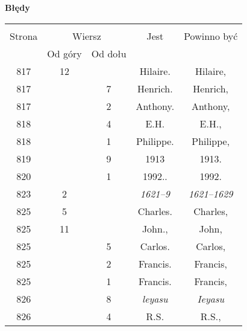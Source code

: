\documentclass[a4paper,11pt]{article}
\newcommand{\tb}{\textbf}
\newcommand{\Center}[1]{\begin{center} #1 \end{center}}
\newcommand{\CenterTB}[1]{\Center{\tb{#1}}}
\begin{document}
\CenterTB{Błędy}
\begin{center}
  \begin{tabular}{|c|c|c|c|c|}
    \hline
    & \multicolumn{2}{c|}{} & & \\
    Strona & \multicolumn{2}{c|}{Wiersz}& Jest & Powinno być \\ \cline{2-3}
    & Od góry & Od dołu &  &  \\ \hline
    817 & 12 & & Hilaire. & Hilaire, \\
    817 & & 7 & Henrich. & Henrich, \\
    817 & & 2 & Anthony. & Anthony, \\
    818 & & 4 & E.H. & E.H., \\
    818 & & 1 & Philippe. & Philippe, \\
    819 & & 9 & 1913 & 1913. \\
    820 & & 1 & 1992.. & 1992. \\
    823 & 2 & & \emph{1621--9} & \emph{1621--1629} \\
    825 & 5 & & Charles. & Charles, \\
    825 & 11 & & John., & John, \\
    825 & & 5 & Carlos. & Carlos, \\
    825 & & 2 & Francis. & Francis, \\
    825 & & 1 & Francis. & Francis, \\
    826 & & 8 & \emph{leyasu} & \emph{Ieyasu} \\
    826 & & 4 & R.S. & R.S., \\
    \hline
  \end{tabular}
\end{center}
\end{document}
